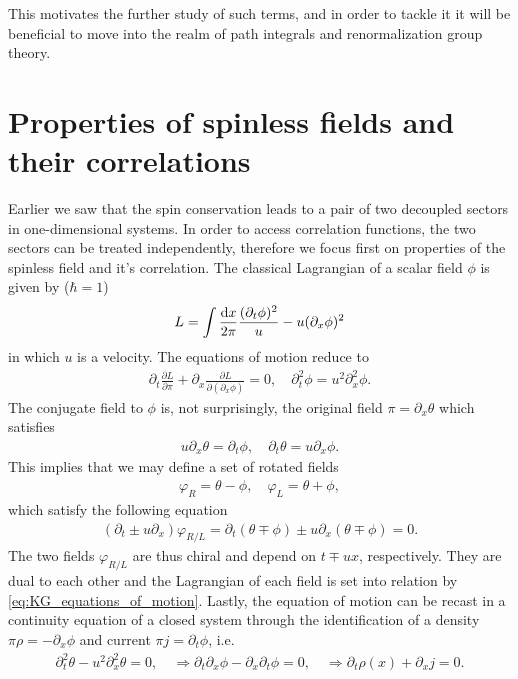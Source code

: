 This motivates the further study of such terms, and in order to tackle it it will be beneficial to move into the realm of path integrals and renormalization group theory.
%
%
\section{Properties of spinless fields and their correlations}
\label{sec:properties_of_spinless_fields_and_their_correlations}
Earlier we saw that the spin conservation leads to a pair of two decoupled sectors in one-dimensional systems.
In order to access correlation functions, the two sectors can be treated independently, therefore we focus first on properties of the spinless field and it's correlation.
The classical Lagrangian of a scalar field $\phi$ is given by ($\hbar=1$)
\begin{align}
    L = \int\frac{\mathrm d x}{2\pi}\frac{(\partial_t\phi)^2}{u}-u(\partial_x\phi)^2
    \label{eq:kg_lagrangian}
\end{align}
in which $u$ is a velocity.
The equations of motion reduce to
\begin{align}
    \partial_t\frac{\partial L}{\partial\pi}+\partial_x\frac{\partial L}{\partial(\partial_x\phi)} = 0,
    \quad
    \partial_t^2\phi  = u^2\partial_x^2\phi.
    \label{eq:KG_equations_of_motion}
\end{align}
The conjugate field to $\phi$ is, not surprisingly, the original field $\pi=\partial_x\theta$ which satisfies
\begin{align}
    u\partial_x\theta=\partial_t\phi,
    \quad
    \partial_t\theta=u\partial_x\phi.
\end{align}
This implies that we may define a set of rotated fields
\begin{align}
    \varphi_R = \theta-\phi,
    \quad
    \varphi_L = \theta+\phi,
\end{align}
which satisfy the following equation
\begin{align}
    (\partial_t \pm u\partial_x)\varphi_{R/L}
    =
    \partial_t(\theta \mp \phi) \pm u\partial_x(\theta \mp \phi)
    =
    0.
\end{align}
The two fields $\varphi_{R/L}$ are thus chiral and depend on $t\mp ux$, respectively.
They are dual to each other and the Lagrangian of each field is set into relation by \cref{eq:KG_equations_of_motion}.
Lastly, the equation of motion can be recast in a continuity equation of a closed system through the identification of a density $\pi\rho=-\partial_x\phi$ and current $\pi j = \partial_t\phi$, i.e.
\begin{align}
    \partial_t^2 \theta - u^2\partial_x^2 \theta = 0,
    \quad
    \Rightarrow
    \partial_t\partial_x \phi - \partial_x\partial_t \phi = 0,
    \quad
    \Rightarrow
    \partial_t \rho(x) + \partial_x  j = 0.
\end{align}

